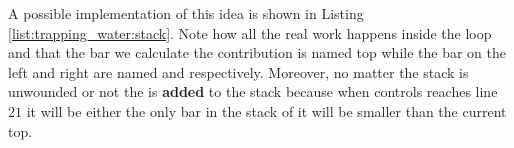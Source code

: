 A possible implementation of this idea is shown in Listing \ref{list:trapping_water:stack}. Note how all the real work happens inside the  loop and that the bar we calculate the contribution is named top while the bar on the left and right are named  and  respectively. Moreover, no matter the stack is unwounded or not the  is \textbf{added} to the stack because when controls reaches line $21$ it will be either the only bar in the stack of it will be smaller than the current top.


